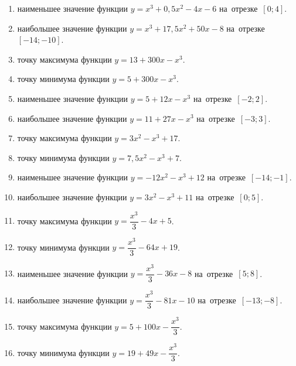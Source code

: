 \documentclass[a4paper,10pt]{article}
\begin{document}
\begin{enumerate}
\item {} наименьшее значение функции $y=x^3 +0,5x^2-4x-6$ на~отрезке~$\left[0;4\right]$.

\item {} наибольшее значение функции $y=x^3 +17,5x^2+50x-8$ на~отрезке~$\left[-14;-10\right]$.

\item {} точку максимума функции $y=13+300x-x^3$.

\item {} точку минимума функции $y=5+300x-x^3$.

\item {} наименьшее значение функции $y=5+12x-x^3$ на~отрезке~$\left[-2;2\right]$.

\item {} наибольшее значение функции $y=11+27x-x^3$ на~отрезке~$\left[-3;3\right]$.

\item {} точку максимума функции $y=3x^2-x^3+17$.

\item {} точку минимума функции $y=7,5x^2-x^3+7$.

\item {} наименьшее значение функции $y=-12x^2-x^3+12$ на~отрезке~$\left[-14;-1\right]$.

\item {} наибольшее значение функции $y=3x^2-x^3+11$ на~отрезке~$\left[0;5\right]$.

\item {} точку максимума функции $y=\dfrac{x^3}{3} -4x+5$.

\item {} точку минимума функции $y=\dfrac{x^3}{3} -64x+19$.

\item {} наименьшее значение функции $y=\dfrac{x^3}{3} -36x-8$ на~отрезке~$\left[5;8\right]$.

\item {} наибольшее значение функции $y=\dfrac{x^3}{3} -81x-10$ на~отрезке~$\left[-13;-8\right]$.

\item {} точку максимума функции $y=5 +100x-\dfrac{x^3}{3}$.

\item {} точку минимума функции $y=19 +49x-\dfrac{x^3}{3}$.


\end{enumerate}
\end{document}
